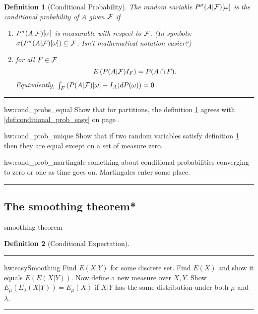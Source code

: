 \documentclass[14pt]{extarticle}
\newtheorem{definition}{Definition}
\newenvironment{textHW}{
  \noindent\rule{\textwidth}{1pt}%
  \begin{list}{}{
      \setlength{\labelwidth}{1cm}
      \setlength{\labelsep}{0.3cm}
      \setlength{\leftmargin}{1.3cm}
      \setlength{\rightmargin}{1cm}
      \setlength{\parsep}{0.5ex plus0.2ex minus0.1ex}
      \setlength{\topsep}{1pt plus3pt minus1pt}
      \setlength{\itemsep}{0ex plus0.2ex} 
      \renewcommand{\makelabel}[1]{\label{thw:##1}{\ref{##1}}}
      \sl}}%
  {\end{list}\rule{\textwidth}{1pt}}
\newcommand{\notes}{}
\begin{document}
\begin{definition}[Conditional Probability]
  \label{def:conditional_prob} The random variable $P^\sigma(A|{\cal
    F})[\omega]$ is the conditional probability of $A$ given ${\cal
    F}$ if 
  \begin{enumerate}
  \item $P^\sigma(A|{\cal F})[\omega]$ is measurable with respect to
    ${\cal F}$.  (In symbols: $\sigma(P^\sigma(A|{\cal F})[\omega] )
    \subseteq {\cal F}$.  Isn't mathematical notation easier?)
  \item for all $F \in {\cal F}$
  \begin{equation}
    E\left(P(A|{\cal F})I_F\right) = P(A \cap F).
    \label{eqn:cond_prob}
  \end{equation}
Equivalently, $\int_F \left(P(A|{\cal F})[\omega] - I_A)
dP(\omega)\right) = 0$. 
\end{enumerate}
\end{definition}


\begin{textHW}
\item[hw:cond_probs_equal] Show that for partitions, the definition
  \ref{def:conditional_prob}  agrees with
  \ref{def:conditional_prob_easy} on page 
  \pageref{def:conditional_prob_easy}.
\item[hw:cond_prob_unique] Show that if two random variables satisfy
  definition   \ref{def:conditional_prob}  then they are equal except
  on a set of measure zero.
\item[hw:cond_prob_martingale] {\notes something about conditional
    probabilities converging to zero or one as time goes on.
    Martingales enter some place.}
\end{textHW}
 
        \subsection{The smoothing theorem*}
%

{\notes smoothing theorem}
\begin{definition}[Conditional Expectation] \label{def:conditional_expectation}
\end{definition}

\begin{textHW}
\item[hw:easySmoothing] {\notes Find $E(X|Y)$ for some discrete set.  Find
    $E(X)$ and show it equals $E(E(X|Y))$.  Now define a new measure
    over $X,Y$.  Show $E_\mu(E_\lambda(X|Y)) = E_\mu(X)$ if
    $X|Y$ has the same distribution under both $\mu$ and
    $\lambda$.}
\end{textHW}
 
\end{document}

